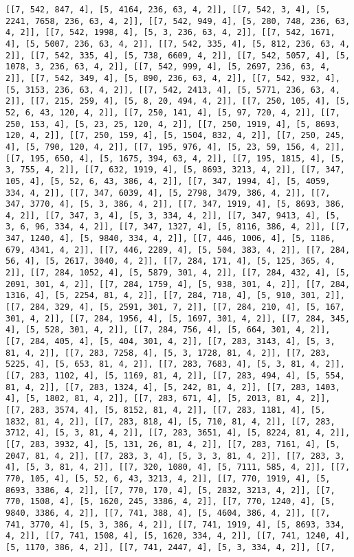 \documentclass[12pt,fleqn]{article}\usepackage{../../common}
\begin{document}
\begin{verbatim}
[[7, 542, 847, 4], [5, 4164, 236, 63, 4, 2]], [[7, 542, 3, 4], [5, 2241, 7658, 236, 63, 4, 2]], [[7, 542, 949, 4], [5, 280, 748, 236, 63, 4, 2]], [[7, 542, 1998, 4], [5, 3, 236, 63, 4, 2]], [[7, 542, 1671, 4], [5, 5007, 236, 63, 4, 2]], [[7, 542, 335, 4], [5, 812, 236, 63, 4, 2]], [[7, 542, 335, 4], [5, 738, 6609, 4, 2]], [[7, 542, 5057, 4], [5, 1078, 3, 236, 63, 4, 2]], [[7, 542, 999, 4], [5, 2697, 236, 63, 4, 2]], [[7, 542, 349, 4], [5, 890, 236, 63, 4, 2]], [[7, 542, 932, 4], [5, 3153, 236, 63, 4, 2]], [[7, 542, 2413, 4], [5, 5771, 236, 63, 4, 2]], [[7, 215, 259, 4], [5, 8, 20, 494, 4, 2]], [[7, 250, 105, 4], [5, 52, 6, 43, 120, 4, 2]], [[7, 250, 141, 4], [5, 97, 720, 4, 2]], [[7, 250, 153, 4], [5, 23, 25, 120, 4, 2]], [[7, 250, 1919, 4], [5, 8693, 120, 4, 2]], [[7, 250, 159, 4], [5, 1504, 832, 4, 2]], [[7, 250, 245, 4], [5, 790, 120, 4, 2]], [[7, 195, 976, 4], [5, 23, 59, 156, 4, 2]], [[7, 195, 650, 4], [5, 1675, 394, 63, 4, 2]], [[7, 195, 1815, 4], [5, 3, 755, 4, 2]], [[7, 632, 1919, 4], [5, 8693, 3213, 4, 2]], [[7, 347, 105, 4], [5, 52, 6, 43, 386, 4, 2]], [[7, 347, 1994, 4], [5, 4059, 334, 4, 2]], [[7, 347, 6039, 4], [5, 2798, 3479, 386, 4, 2]], [[7, 347, 3770, 4], [5, 3, 386, 4, 2]], [[7, 347, 1919, 4], [5, 8693, 386, 4, 2]], [[7, 347, 3, 4], [5, 3, 334, 4, 2]], [[7, 347, 9413, 4], [5, 3, 6, 96, 334, 4, 2]], [[7, 347, 1327, 4], [5, 8116, 386, 4, 2]], [[7, 347, 1240, 4], [5, 9840, 334, 4, 2]], [[7, 446, 1006, 4], [5, 1186, 679, 4341, 4, 2]], [[7, 446, 2289, 4], [5, 504, 383, 4, 2]], [[7, 284, 56, 4], [5, 2617, 3040, 4, 2]], [[7, 284, 171, 4], [5, 125, 365, 4, 2]], [[7, 284, 1052, 4], [5, 5879, 301, 4, 2]], [[7, 284, 432, 4], [5, 2091, 301, 4, 2]], [[7, 284, 1759, 4], [5, 938, 301, 4, 2]], [[7, 284, 1316, 4], [5, 2254, 81, 4, 2]], [[7, 284, 718, 4], [5, 910, 301, 2]], [[7, 284, 329, 4], [5, 2591, 301, 7, 2]], [[7, 284, 210, 4], [5, 167, 301, 4, 2]], [[7, 284, 1956, 4], [5, 1697, 301, 4, 2]], [[7, 284, 345, 4], [5, 528, 301, 4, 2]], [[7, 284, 756, 4], [5, 664, 301, 4, 2]], [[7, 284, 405, 4], [5, 404, 301, 4, 2]], [[7, 283, 3143, 4], [5, 3, 81, 4, 2]], [[7, 283, 7258, 4], [5, 3, 1728, 81, 4, 2]], [[7, 283, 5225, 4], [5, 653, 81, 4, 2]], [[7, 283, 7683, 4], [5, 3, 81, 4, 2]], [[7, 283, 1102, 4], [5, 1169, 81, 4, 2]], [[7, 283, 494, 4], [5, 554, 81, 4, 2]], [[7, 283, 1324, 4], [5, 242, 81, 4, 2]], [[7, 283, 1403, 4], [5, 1802, 81, 4, 2]], [[7, 283, 671, 4], [5, 2013, 81, 4, 2]], [[7, 283, 3574, 4], [5, 8152, 81, 4, 2]], [[7, 283, 1181, 4], [5, 1832, 81, 4, 2]], [[7, 283, 818, 4], [5, 710, 81, 4, 2]], [[7, 283, 3712, 4], [5, 3, 81, 4, 2]], [[7, 283, 3651, 4], [5, 8224, 81, 4, 2]], [[7, 283, 3932, 4], [5, 131, 26, 81, 4, 2]], [[7, 283, 7161, 4], [5, 2047, 81, 4, 2]], [[7, 283, 3, 4], [5, 3, 3, 81, 4, 2]], [[7, 283, 3, 4], [5, 3, 81, 4, 2]], [[7, 320, 1080, 4], [5, 7111, 585, 4, 2]], [[7, 770, 105, 4], [5, 52, 6, 43, 3213, 4, 2]], [[7, 770, 1919, 4], [5, 8693, 3386, 4, 2]], [[7, 770, 170, 4], [5, 2832, 3213, 4, 2]], [[7, 770, 1508, 4], [5, 1620, 245, 3386, 4, 2]], [[7, 770, 1240, 4], [5, 9840, 3386, 4, 2]], [[7, 741, 388, 4], [5, 4604, 386, 4, 2]], [[7, 741, 3770, 4], [5, 3, 386, 4, 2]], [[7, 741, 1919, 4], [5, 8693, 334, 4, 2]], [[7, 741, 1508, 4], [5, 1620, 334, 4, 2]], [[7, 741, 1240, 4], [5, 1170, 386, 4, 2]], [[7, 741, 2447, 4], [5, 3, 334, 4, 2]], [[7, 
\end{verbatim}
\end{document}
